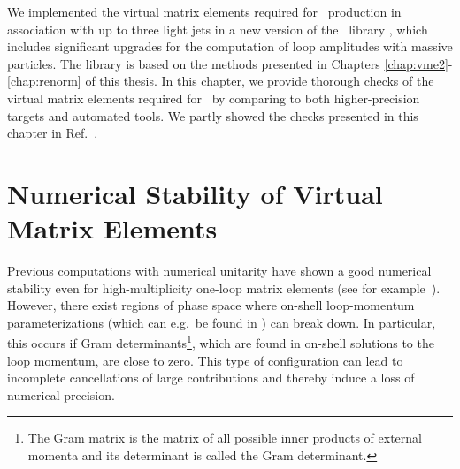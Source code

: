 We implemented the virtual matrix elements required for
\Wbb~production in association with up to three light jets in a new
version of the \BlackHat~library \cite{Berger:2008sj}, which includes significant
upgrades for the computation of loop amplitudes with massive
particles. The library is based on the methods
presented in Chapters \ref{chap:vme2}-\ref{chap:renorm} of this
thesis. In this chapter, we provide thorough checks of the virtual
matrix elements required for \mbox{\Wbbn}~by comparing to both higher-precision targets and
automated tools. We partly showed the checks presented in this chapter
in Ref.~\cite{wbbpaper}.



\section{Numerical Stability of Virtual Matrix Elements}
\label{sec:numstab}

Previous computations with numerical unitarity have shown a good numerical stability even for high-multiplicity one-loop matrix elements (see for
example~\cite{BH:W3jDistributions,BH:W5j}). However, there exist
regions of phase space where on-shell loop-momentum parameterizations (which can e.g.\ be found in \cite{Kilgore2007}) can break down. In particular, this occurs if Gram determinants\footnote{The Gram matrix is the matrix of all possible inner products of external momenta and its determinant is called the Gram determinant.}, which are found in on-shell solutions to the loop momentum, are
close to zero. This type of configuration can lead to incomplete cancellations of large contributions and
thereby induce a loss of numerical precision. 





